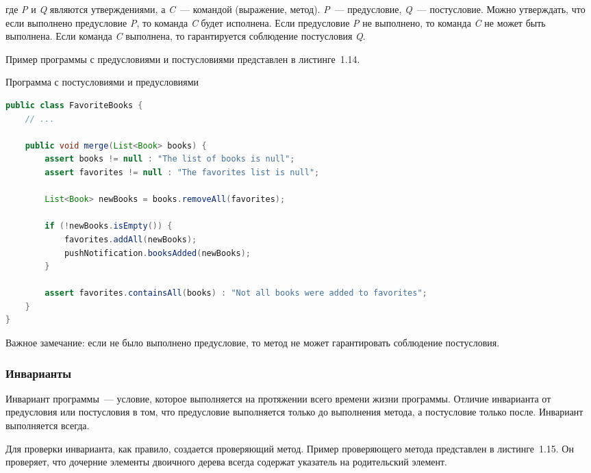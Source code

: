 где \textit{P} и \textit{Q} являются утверждениями, а \textit{C}~--- командой (выражение, метод). \textit{P}~--- предусловие, \textit{Q}~--- постусловие. Можно утверждать, что если выполнено предусловие \textit{P}, то команда \textit{C} будет исполнена. Если предусловие \textit{P} не выполнено, то команда \textit{C} не может быть выполнена. Если команда \textit{C} выполнена, то гарантируется соблюдение постусловия \textit{Q}.

Пример программы с предусловиями и постусловиями представлен в листинге~1.14.

\begin{ListingEnv}[!h]%
	\captiondelim{ } %
	\caption{Программа с постусловиями и предусловиями}
	\begin{lstlisting}[language={Java}]
public class FavoriteBooks {
	// ...
	
	public void merge(List<Book> books) {
		assert books != null : "The list of books is null";
		assert favorites != null : "The favorites list is null";
		
		List<Book> newBooks = books.removeAll(favorites);
		
		if (!newBooks.isEmpty()) {
			favorites.addAll(newBooks);
			pushNotification.booksAdded(newBooks);
		}
		
		assert favorites.containsAll(books) : "Not all books were added to favorites";
	}
}
	\end{lstlisting}
\end{ListingEnv}%

Важное замечание: если не было выполнено предусловие, то метод не может гарантировать соблюдение постусловия.

\subsubsection{Инварианты}	

Инвариант программы~--- условие, которое выполняется на протяжении всего времени жизни программы. Отличие инварианта от предусловия или постусловия в том, что предусловие выполняется только до выполнения метода, а постусловие только после. Инвариант выполняется всегда.

Для проверки инварианта, как правило, создается проверяющий метод. Пример проверяющего метода представлен в листинге~1.15. Он проверяет, что дочерние элементы двоичного дерева всегда содержат указатель на родительский элемент.

